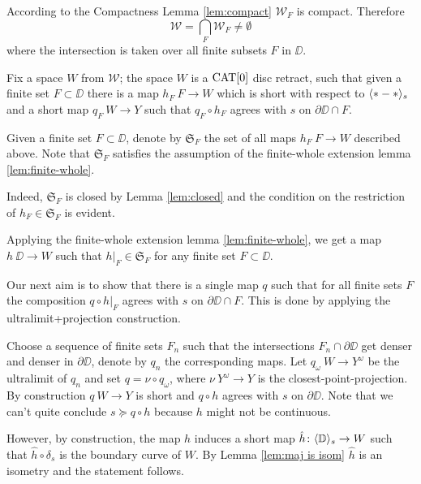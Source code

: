 According to the Compactness Lemma \ref{lem:compact} $\mathcal{W}_F$ is compact.
Therefore 
\[\mathcal{W}
=
\bigcap_{F}\mathcal{W}_F\ne \emptyset\]
where the intersection is taken over all finite subsets $F$ in $\DD$. 


Fix a space $W$ from $\mathcal{W}$;
the space $W$ is a $\mathop{\rm CAT}\nolimits[0]$ disc retract,
such that given a finite set $F\subset \DD$ there is a map $h_F\:F\to W$ which is short with 
respect to $\langle{*}-{*}\rangle_s$ 
and a short map $q_F\:W\to Y$ such that $q_F\circ h_F$ agrees with $s$ on $\partial\DD\cap F$.

Given a finite set $F\subset \DD$,
denote by $\mathfrak{S}_F$ the set of all maps $h_F\:F\to W$ described above.
Note that $\mathfrak{S}_F$ satisfies the assumption of the finite-whole extension lemma \ref{lem:finite-whole}.

Indeed, $\mathfrak{S}_F$ is closed by Lemma \ref{lem:closed} and the condition on the restriction of $h_F\in  \mathfrak{S}_F$ is evident.

Applying the finite-whole extension lemma \ref{lem:finite-whole},
we get a map $h\:\DD\to W$ such that $h|_F\in \mathfrak{S}_F$
for any finite set $F\subset \DD$.

Our next aim is to show that there is a single map $q$ such that
for all finite sets $F$ the composition $q\circ h|_F$ agrees with
$s$ on $\partial\DD\cap F$.
This is done by applying the ultralimit+projection construction.

Choose a sequence of finite sets $F_n$ such that the intersections $F_n\cap\partial \DD$ get denser and denser in $\partial \DD$, 
denote by $q_n$ the corresponding maps.
Let $q_\omega\:W\to Y^\omega$ be the ultralimit of $q_n$ and set $q=\nu\circ q_\omega$,
where $\nu\:Y^\omega\to Y$ is the closest-point-projection.
By construction $q\:W\to Y$ is short and $q\circ h$ agrees with $s$ on $\partial \DD$.
Note that we can't quite conclude $s\succcurlyeq q\circ h$ because $h$ might not be continuous.

However, by construction, the map $h$ induces a short map $\hat h\colon\langle\mathbb{D}\rangle_s\to W$ 
such that $\hat h\circ\delta_s$ is the boundary curve of $W$. By Lemma \ref{lem:maj is isom}
$\hat h$ is an isometry and the statement follows.

\qeds